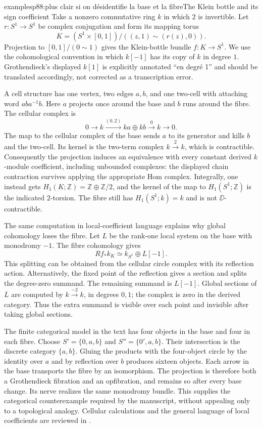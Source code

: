 \begin{dcomment}{examples}{p88:plus clair si on désidentifie la base et la fibre}{The Klein bottle and its sign coefficient}
Take a nonzero commutative ring $k$ in which $2$ is invertible. Let $r:S^1\to S^1$ be complex conjugation and form its mapping torus
\[
 K=(S^1\times[0,1])/((z,1)\sim(r(z),0)).
\]
Projection to $[0,1]/(0\sim1)$ gives the Klein-bottle bundle $f:K\to S^1$. We use the cohomological convention in which $k[-1]$ has its copy of $k$ in degree $1$. Grothendieck's displayed $k[1]$ is explicitly annotated ``en degr\'e 1'' and should be translated accordingly, not corrected as a transcription error.

A cell structure has one vertex, two edges $a,b$, and one two-cell with attaching word $aba^{-1}b$. Here $a$ projects once around the base and $b$ runs around the fibre. The cellular complex is
\[
 0\longrightarrow k\xrightarrow{(0,2)}k a\oplus k b
                         \xrightarrow{0}k\longrightarrow0.
\]
The map to the cellular complex of the base sends $a$ to its generator and kills $b$ and the two-cell. Its kernel is the two-term complex $k\xrightarrow{2}k$, which is contractible. Consequently the projection induces an equivalence with every constant derived $k$-module coefficient, including unbounded complexes: the displayed chain contraction survives applying the appropriate Hom complex. Integrally, one instead gets $H_1(K;\mathbb Z)=\mathbb Z\oplus\mathbb Z/2$, and the kernel of the map to $H_1(S^1;\mathbb Z)$ is the indicated $2$-torsion. The fibre still has $H_1(S^1;k)=k$ and is not $\DD$-contractible.

The same computation in local-coefficient language explains why global cohomology loses the fibre. Let $L$ be the rank-one local system on the base with monodromy $-1$. The fibre cohomology gives
\[
 Rf_*k_K\simeq k_{S^1}\oplus L[-1].
\]
This splitting can be obtained from the cellular circle complex with its reflection action. Alternatively, the fixed point of the reflection gives a section and splits the degree-zero summand. The remaining summand is $L[-1]$. Global sections of $L$ are computed by $k\xrightarrow{-2}k$, in degrees $0,1$; the complex is zero in the derived category. Thus the extra summand is visible over each point and invisible after taking global sections.

The finite categorical model in the text has four objects in the base and four in each fibre. Choose $S'=\{0,a,b\}$ and $S''=\{0',a,b\}$. Their intersection is the discrete category $\{a,b\}$. Gluing the products with the four-object circle by the identity over $a$ and by reflection over $b$ produces sixteen objects. Each arrow in the base transports the fibre by an isomorphism. The projection is therefore both a Grothendieck fibration and an opfibration, and remains so after every base change. Its nerve realizes the same monodromy bundle. This supplies the categorical counterexample required by the manuscript, without appealing only to a topological analogy. Cellular calculations and the general language of local coefficients are reviewed in \citet[\S\S2.2, 3.H]{Hatcher2002}.
\end{dcomment}


